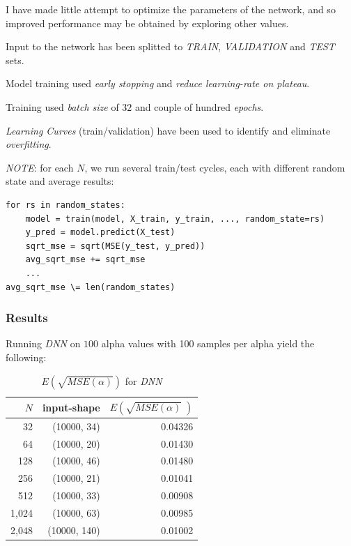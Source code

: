 \documentclass[a4paper, 12pt]{report}
\begin{document}
I have made little attempt to optimize the parameters of the network, and
so improved performance may be obtained by exploring other values.

Input to the network has been splitted to \textit{TRAIN}, \textit{VALIDATION} and \textit{TEST} sets.

Model training used \textit{early stopping} and \textit{reduce learning-rate on plateau}.

Training used \textit{batch size} of $32$ and couple of hundred \textit{epochs}.

\textit{Learning Curves} (train/validation) have been used to identify and eliminate \textit{overfitting}.

\textit{NOTE}: for each $N$, we run several train/test cycles, each with different random state and average results:
\begin{verbatim}
for rs in random_states:
    model = train(model, X_train, y_train, ..., random_state=rs)
    y_pred = model.predict(X_test)
    sqrt_mse = sqrt(MSE(y_test, y_pred))
    avg_sqrt_mse += sqrt_mse
    ...
avg_sqrt_mse \= len(random_states)
\end{verbatim}

\subsubsection{Results}
Running \textit{DNN} on $100$ alpha values with 100 samples per alpha yield the following:

\begin{table}[h!]
    \centering
    \begin{tabular}{r r r} 
        $N$ & input-shape & $E\left(\sqrt{MSE(\alpha)}\;\right)$ \\
        \hline
        32 & (10000, 34) & 0.04326 \\ 
        64 & (10000, 20) & 0.01430 \\
        128 & (10000, 46) & 0.01480 \\
        \rowcolor{yellow}
        256 & (10000, 21) & 0.01041 \\
        512 & (10000, 33) & 0.00908 \\ 
        1,024 & (10000, 63) & 0.00985 \\ 
        2,048 & (10000, 140) & 0.01002 \\ 
    \end{tabular}
    \caption{$E\left(\sqrt{MSE(\alpha)}\right)$ for \textit{DNN}}
    \label{table:dnn-sqrt-mse}
\end{table}
\end{document}
